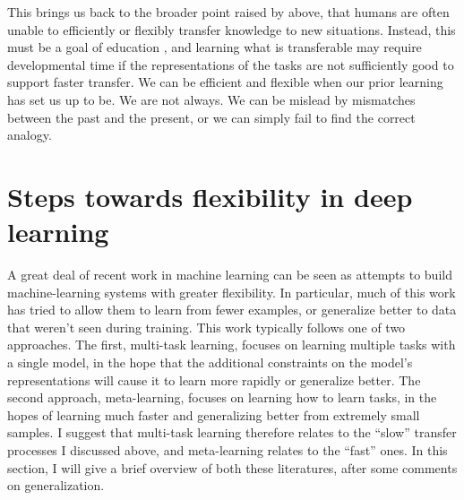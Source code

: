 This brings us back to the broader point raised by \citet{Detterman1993} above, that humans are often unable to efficiently or flexibly transfer knowledge to new situations. Instead, this must be a goal of education \citep{Bransford1999}, and learning what is transferable may require developmental time \citep{Lampinen2017a} if the representations of the tasks are not sufficiently good to support faster transfer. We can be efficient and flexible when our prior learning has set us up to be. We are not always. We can be mislead by mismatches between the past and the present, or we can simply fail to find the correct analogy.\par

\section{Steps towards flexibility in deep learning}

A great deal of recent work in machine learning can be seen as attempts to build machine-learning systems with greater flexibility. In particular, much of this work has tried to allow them to learn from fewer examples, or generalize better to data that weren't seen during training. This work typically follows one of two approaches. The first, multi-task learning, focuses on learning multiple tasks with a single model, in the hope that the additional constraints on the model's representations will cause it to learn more rapidly or generalize better. The second approach, meta-learning, focuses on learning how to learn tasks, in the hopes of learning much faster and generalizing better from extremely small samples. I suggest that multi-task learning therefore relates to the ``slow'' transfer processes I discussed above, and meta-learning relates to the ``fast'' ones. In this section, I will give a brief overview of both these literatures, after some comments on generalization. \par

